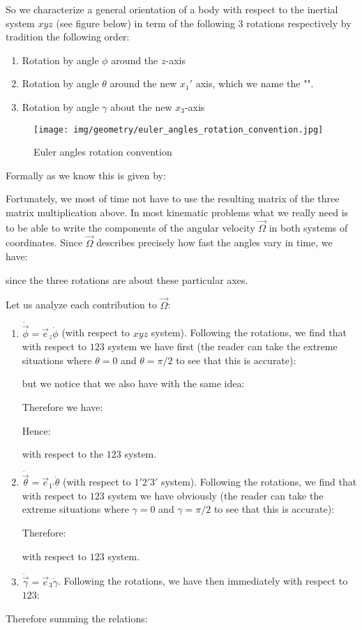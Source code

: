 		So we characterize a general orientation of a body with respect to the inertial system $xyz$ (see figure below) in term of the following $3$ rotations respectively by tradition the following order:
	\begin{enumerate}
		\item Rotation by angle $\phi$ around the $z$-axis
		\item Rotation by angle $\theta$ around the new $x_1'$ axis, which we name the "".
		\item Rotation by angle $\gamma$ about the new $x_3$-axis
	\end{enumerate}
	\begin{figure}[H]
		\centering
		\texttt{[image: img/geometry/euler\_angles\_rotation\_convention.jpg]}
		\caption{Euler angles rotation convention}
	\end{figure}
	Formally as we know this is given by:
	
	Fortunately, we most of time not have to use the resulting matrix of the three matrix multiplication above. In most kinematic problems what we really need is to be able to write the components of the angular velocity $\vec{\Omega}$ in both systems of coordinates. Since $\vec{\Omega}$­ describes precisely how fast the angles vary in time, we have:
	
	since the three rotations are about these particular axes.

	Let us analyze each contribution to $\vec{\Omega}$:
	\begin{enumerate}
		\item $\dot{\vec{\phi}}=\vec{e}_z\dot{\phi}$ (with respect to $xyz$ system). Following the rotations, we find that with respect to $123$ system we have first (the reader can take the extreme situations where $\theta=0$ and $\theta=\pi/2$ to see that this is accurate):
		
		but we notice that we also have with the same idea:
		
		Therefore we have:
		
		Hence:
		
		with respect to the $123$ system.
		
		\item $\dot{\vec{\theta}}=\vec{e}_{1'}\dot{\theta}$ (with respect to $1'2'3'$ system). Following the rotations, we find that with respect to $123$ system we have obviously (the reader can take the extreme situations where $\gamma=0$ and $\gamma=\pi/2$ to see that this is accurate):
		
		Therefore:
		
		with respect to $123$ system.

		\item $\dot{\vec{\gamma}}=\vec{e}_{3}\dot{\gamma}$. Following the rotations, we have then immediately with respect to $123$:
		
	\end{enumerate}
	Therefore summing the relations:
	
